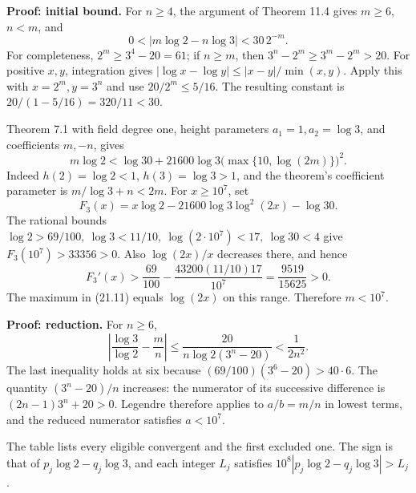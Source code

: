 \documentclass[
  11pt,
  a4paper,
]{article}
\begin{document}
\textbf{Proof: initial bound.} For \(n\ge4\), the argument of Theorem
11.4 gives \(m\ge6\), \(n<m\), and \[
 0<|m\log2-n\log3|<30\,2^{-m}.
\] For completeness, \(2^m\ge3^4-20=61\); if \(n\ge m\), then
\(3^n-2^m\ge3^m-2^m>20\). For positive \(x,y\), integration gives
\(|\log x-\log y|\le |x-y|/\min(x,y)\). Apply this with \(x=2^m,y=3^n\)
and use \(20/2^m\le5/16\). The resulting constant is
\(20/(1-5/16)=320/11<30\).

Theorem 7.1 with field degree one, height parameters
\(a_1=1,a_2=\log3\), and coefficients \(m,-n\), gives \[
 m\log2<\log30+
 21600\log3\bigl(\max\{10,\log(2m)\}\bigr)^2.
 \tag{21.11}
\] Indeed \(h(2)=\log2<1\), \(h(3)=\log3>1\), and the theorem's
coefficient parameter is \(m/\log3+n<2m\). For \(x\ge10^7\), set \[
 F_3(x)=x\log2-21600\log3\log^2(2x)-\log30.
\] The rational bounds
\(\log2>69/100,\ \log3<11/10,\ \log(2\cdot10^7)<17,\ \log30<4\) give
\(F_3(10^7)>33356>0\). Also \(\log(2x)/x\) decreases there, and hence \[
 F_3'(x)>
 \frac{69}{100}-\frac{43200(11/10)17}{10^7}
 =\frac{9519}{15625}>0.
\] The maximum in (21.11) equals \(\log(2x)\) on this range. Therefore
\(m<10^7\).

\textbf{Proof: reduction.} For \(n\ge6\), \[
 \left|\frac{\log3}{\log2}-\frac mn\right|
 \le\frac{20}{n\log2(3^n-20)}<\frac1{2n^2}.
 \tag{21.12}
\] The last inequality holds at six because
\((69/100)(3^6-20)>40\cdot6\). The quantity \((3^n-20)/n\) increases:
the numerator of its successive difference is \((2n-1)3^n+20>0\).
Legendre therefore applies to \(a/b=m/n\) in lowest terms, and the
reduced numerator satisfies \(a<10^7\).

The table lists every eligible convergent and the first excluded one.
The sign is that of \(p_j\log2-q_j\log3\), and each integer \(L_j\)
satisfies \(10^8|p_j\log2-q_j\log3|>L_j\).
\end{document}
